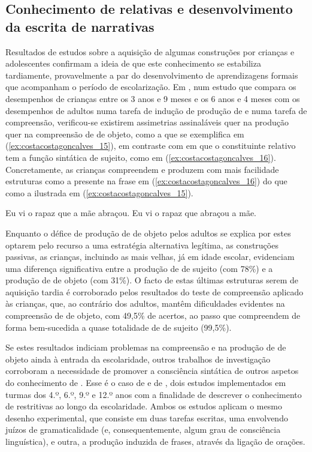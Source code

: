 \documentclass[output=paper]{LSP/langsci}
\begin{document}
\subsection{Conhecimento de relativas e desenvolvimento da escrita de narrativas}
\label{subsec:costacostagoncalves_conhecimento:relativas}
Resultados de estudos sobre a aquisição de algumas construções  por crianças e adolescentes confirmam a ideia de que este conhecimento se estabiliza tardiamente, provavelmente a par do desenvolvimento de aprendizagens formais que acompanham o período de escolarização. Em \citet{costa_etal2011}, num estudo que compara os desempenhos de crianças entre os 3 anos e 9 meses e os 6 anos e 4 meses com os desempenhos de adultos numa tarefa de indução de produção de  e numa tarefa de compreensão, verificou-se existirem assimetrias assinaláveis quer na produção quer na compreensão de  de objeto, como a que se exemplifica em (\ref{ex:costacostagoncalves_15}), em contraste com  em que o constituinte relativo tem a função sintática de sujeito, como em (\ref{ex:costacostagoncalves_16}). Concretamente, as crianças compreendem e produzem com mais facilidade estruturas  como a presente na frase em (\ref{ex:costacostagoncalves_16}) do que  como a ilustrada em (\ref{ex:costacostagoncalves_15}).

\ea\label{ex:costacostagoncalves_15} Eu vi o rapaz que a mãe abraçou.\z
\ea\label{ex:costacostagoncalves_16} Eu vi o rapaz que abraçou a mãe.\z 

Enquanto o défice de produção de  de objeto pelos adultos se explica por estes optarem pelo recurso a uma estratégia alternativa legítima, as construções passivas, as crianças, incluindo as mais velhas, já em idade escolar, evidenciam uma diferença significativa entre a produção de  de sujeito (com 78\%) e a produção de  de objeto (com 31\%). O facto de estas últimas estruturas serem de aquisição tardia é corroborado pelos resultados do teste de compreensão aplicado às crianças, que, ao contrário dos adultos, mantêm dificuldades evidentes na compreensão de  de objeto, com 49,5\% de acertos, ao passo que compreendem de forma bem-sucedida a quase totalidade de  de sujeito (99,5\%).

Se estes resultados indiciam problemas na compreensão e na produção de  de objeto ainda à entrada da escolaridade, outros trabalhos de investigação corroboram a necessidade de promover a consciência sintática de outros aspetos do conhecimento de . Esse é o caso de \citet{fontes2008} e de \citet{valente2008}, dois estudos implementados em turmas dos 4.º, 6.º, 9.º e 12.º anos com a finalidade de descrever o conhecimento de  restritivas ao longo da escolaridade. Ambos os estudos aplicam o mesmo desenho experimental, que consiste em duas tarefas escritas, uma envolvendo juízos de gramaticalidade (e, consequentemente, algum grau de consciência linguística), e outra, a produção induzida de frases, através da ligação de orações. 
\end{document}
